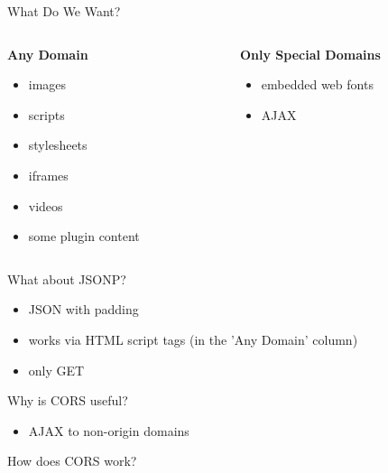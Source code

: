 \documentclass[11pt]{beamer}
\begin{document}
\begin{frame}{What Do We Want?}
  \begin{columns}[t]
    \begin{column}[t]{5cm}
      \textbf{Any Domain}\pause
      \hline
      \begin{itemize}
      \item images\pause
      \item scripts\pause
      \item stylesheets\pause
      \item iframes\pause
      \item videos\pause
      \item some plugin content\pause
      \end{itemize}
    \end{column}
    \begin{column}[t]{5cm}
      \textbf{Only Special Domains}\pause
      \hline
      \begin{itemize}
      \item embedded web fonts\pause
      \item AJAX
      \end{itemize}
    \end{column}
  \end{columns}
\end{frame}

\begin{frame}{What about JSONP?}
  \begin{itemize}
  \item JSON with padding\pause
  \item works via HTML script tags (in the 'Any Domain' column)\pause
  \item only GET
  \end{itemize}
\end{frame}

\begin{frame}{Why is CORS useful?}
  \begin{itemize}
    \item AJAX to non-origin domains
  \end{itemize}
\end{frame}

\begin{frame}{How does CORS work?}

\end{frame}
\end{document}
